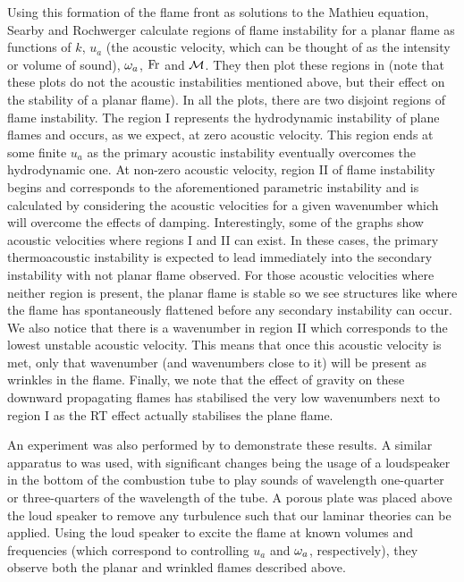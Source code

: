 Using this formation of the flame front as solutions to the Mathieu equation, Searby and Rochwerger \cite{searby1991ParametricAcousticInstability} calculate regions of flame instability for a planar flame as functions of $k$, $u_a$ (the acoustic velocity, which can be thought of as the intensity or volume of sound), $\omega_a$, $\mathrm{Fr}$ and $\mathcal{M}$. They then plot these regions in  (note that these plots do not the acoustic instabilities mentioned above, but their effect on the stability of a planar flame). In all the plots, there are two disjoint regions of flame instability. The region I represents the hydrodynamic instability of plane flames and occurs, as we expect, at zero acoustic velocity. This region ends at some finite $u_a$ as the primary acoustic instability eventually overcomes the hydrodynamic one. At non-zero acoustic velocity, region II of flame instability begins and corresponds to the aforementioned parametric instability and is calculated by considering the acoustic velocities for a given wavenumber which will overcome the effects of damping. Interestingly, some of the graphs show acoustic velocities where regions I and II can exist. In these cases, the primary thermoacoustic instability is expected to lead immediately into the secondary instability with not planar flame observed. For those acoustic velocities where neither region is present, the planar flame is stable so we see structures like  where the flame has spontaneously flattened before any secondary instability can occur. We also notice that there is a wavenumber in region II which corresponds to the lowest unstable acoustic velocity. This means that once this acoustic velocity is met, only that wavenumber (and wavenumbers close to it) will be present as wrinkles in the flame. Finally, we note that the effect of gravity on these downward propagating flames has stabilised the very low wavenumbers next to region I as the RT effect actually stabilises the plane flame.

An experiment was also performed by \cite{searby1991ParametricAcousticInstability} to demonstrate these results. A similar apparatus to  was used, with significant changes being the usage of a loudspeaker in the bottom of the combustion tube to play sounds of wavelength one-quarter or three-quarters of the wavelength of the tube. A porous plate was placed above the loud speaker to remove any turbulence such that our laminar theories can be applied. Using the loud speaker to excite the flame at known volumes and frequencies (which correspond to controlling $u_a$ and $\omega_a$, respectively), they observe both the planar and wrinkled flames described above.





